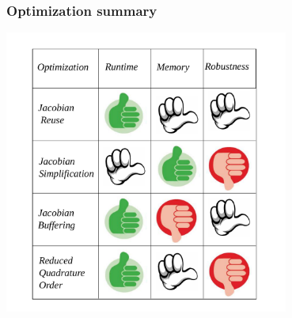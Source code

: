 \begin{frame}
  \frametitle{Optimization summary}

  \begin{center}
    \includegraphics[width=0.7\textwidth]{pdf/optimizationsummary.pdf}
  \end{center}

\end{frame}
